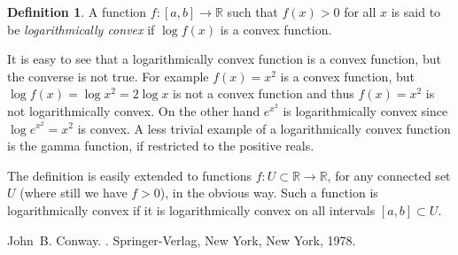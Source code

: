 \documentclass[12pt]{article}
\theoremstyle{theorem}
\theoremstyle{definition}
\newtheorem*{defn}{Definition}
\begin{document}
\begin{defn}
A function $f\colon [a,b] \to {\mathbb{R}}$ such that $f(x) > 0$ for all $x$ is said
to be {\em logarithmically convex} if $\log f(x)$ is a convex function.
\end{defn}

It is easy to see that a logarithmically convex function is a convex function, but the converse is not true.  For example $f(x) = x^2$ is a convex function, but $\log f(x) = \log x^2 = 2 \log x$ is not a convex function and thus $f(x) = x^2$ is not logarithmically convex.  On the other hand $e^{x^2}$ is logarithmically convex since $\log e^{x^2} = x^2$ is convex.  A less trivial example of a logarithmically convex function is the gamma function, if restricted to the positive reals.

The definition is easily extended to functions $f\colon U \subset {\mathbb{R}} \to {\mathbb{R}}$, for any connected set $U$ (where still we have $f > 0$), in the obvious way.  Such a function is logarithmically convex if it is logarithmically convex on all intervals
$[a,b] \subset U$.

\begin{thebibliography}{9}
John~B. Conway.
{\em {}}.
Springer-Verlag, New York, New York, 1978.
\end{thebibliography}
\end{document}
